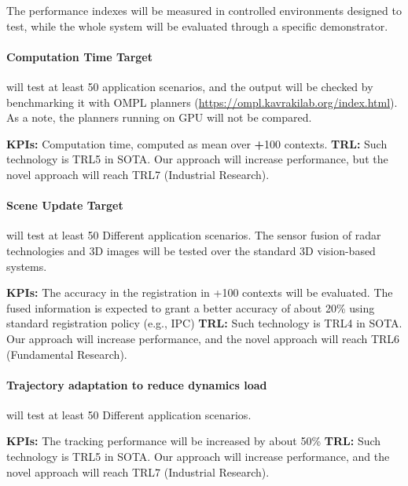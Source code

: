 The performance indexes will be measured in controlled environments
designed to test, while the whole system will be evaluated through a
specific demonstrator.

\paragraph{Computation Time Target}\label{computation-time-target}

 will test at least 50 application scenarios, and the
output will be checked by benchmarking it with OMPL planners
(\url{https://ompl.kavrakilab.org/index.html}). As a note, the planners
running on GPU will not be compared.

\textbf{KPIs:} Computation time, computed as mean over \textbf{+}100
contexts. \textbf{\textbar{} TRL:} Such technology is TRL5 in SOTA. Our
approach will increase performance, but the novel approach will reach
TRL7 (Industrial Research).

\paragraph{Scene Update Target}\label{scene-update-target}

 will test at least 50 Different application scenarios.
The sensor fusion of radar technologies and 3D images will be tested
over the standard 3D vision-based systems.

\textbf{KPIs:} The accuracy in the registration in +100 contexts will be
evaluated. The fused information is expected to grant a better accuracy
of about 20\% using standard registration policy (e.g., IPC)
\textbf{\textbar{} TRL:} Such technology is TRL4 in SOTA. Our approach
will increase performance, and the novel approach will reach TRL6
(Fundamental Research).

\paragraph{\texorpdfstring{Trajectory adaptation to reduce dynamics load
}{Trajectory adaptation to reduce dynamics load }}\label{trajectory-adaptation-to-reduce-dynamics-load}

 will test at least 50 Different application scenarios.

\textbf{KPIs:} The tracking performance will be increased by about 50\%
\textbf{\textbar{} TRL:} Such technology is TRL5 in SOTA. Our approach
will increase performance, and the novel approach will reach TRL7
(Industrial Research).

